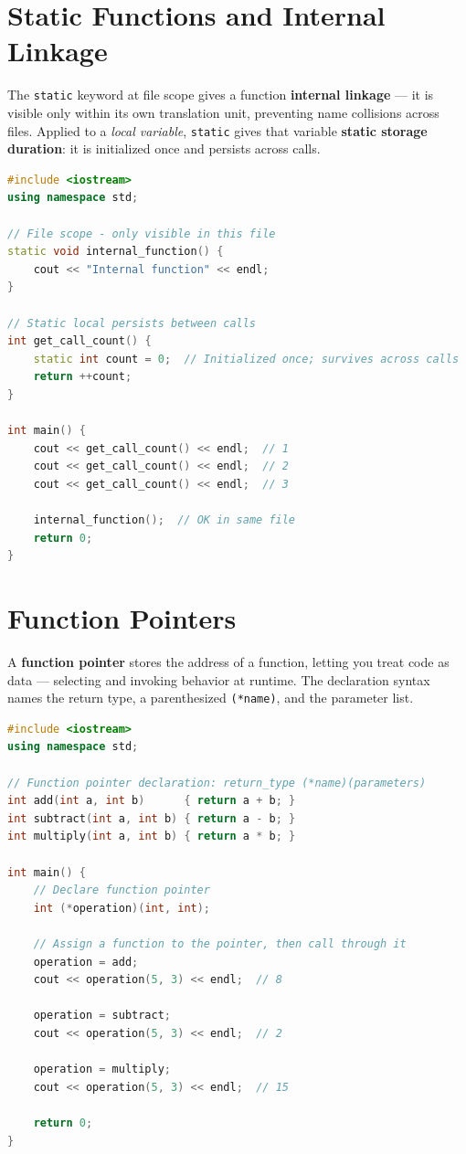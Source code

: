\section{Static Functions and Internal Linkage}
\label{sec:static-functions}

The \texttt{static} keyword at file scope gives a function \textbf{internal linkage} --- it is visible only within its own translation unit, preventing name collisions across files. Applied to a \textit{local variable}, \texttt{static} gives that variable \textbf{static storage duration}: it is initialized once and persists across calls.

\begin{lstlisting}[language=C++, caption={static for file scope and persistent state}]
#include <iostream>
using namespace std;

// File scope - only visible in this file
static void internal_function() {
    cout << "Internal function" << endl;
}

// Static local persists between calls
int get_call_count() {
    static int count = 0;  // Initialized once; survives across calls
    return ++count;
}

int main() {
    cout << get_call_count() << endl;  // 1
    cout << get_call_count() << endl;  // 2
    cout << get_call_count() << endl;  // 3

    internal_function();  // OK in same file
    return 0;
}
\end{lstlisting}

\section{Function Pointers}
\label{sec:function-pointers}

A \textbf{function pointer} stores the address of a function, letting you treat code as data --- selecting and invoking behavior at runtime. The declaration syntax names the return type, a parenthesized \texttt{(*name)}, and the parameter list.

\begin{lstlisting}[language=C++, caption={Declaring and reassigning a function pointer}]
#include <iostream>
using namespace std;

// Function pointer declaration: return_type (*name)(parameters)
int add(int a, int b)      { return a + b; }
int subtract(int a, int b) { return a - b; }
int multiply(int a, int b) { return a * b; }

int main() {
    // Declare function pointer
    int (*operation)(int, int);

    // Assign a function to the pointer, then call through it
    operation = add;
    cout << operation(5, 3) << endl;  // 8

    operation = subtract;
    cout << operation(5, 3) << endl;  // 2

    operation = multiply;
    cout << operation(5, 3) << endl;  // 15

    return 0;
}
\end{lstlisting}

